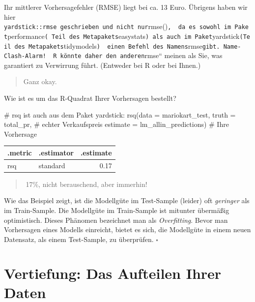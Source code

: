 \documentclass[
  letterpaper,
  twoside,
  open=any]{scrbook}
\newenvironment{Shaded}{\begin{snugshade}}{\end{snugshade}}
\newcommand{\AttributeTok}[1]{\textcolor[rgb]{0.40,0.45,0.13}{#1}}
\newcommand{\CommentTok}[1]{\textcolor[rgb]{0.37,0.37,0.37}{#1}}
\newcommand{\FunctionTok}[1]{\textcolor[rgb]{0.28,0.35,0.67}{#1}}
\newcommand{\NormalTok}[1]{\textcolor[rgb]{0.00,0.23,0.31}{#1}}
\theoremstyle{definition}
\theoremstyle{definition}
\theoremstyle{definition}
\theoremstyle{remark}
\begin{document}
Ihr mittlerer Vorhersagefehler (RMSE) liegt bei ca. 13 Euro. Übrigens
haben wir hier
\texttt{yardstick::rmse\ geschrieben\ und\ nicht\ nur}rmse()\texttt{,\ \ da\ es\ sowohl\ im\ Paket}performance\texttt{(\ Teil\ des\ Metapakets}easystats\texttt{)\ als\ auch\ im\ Paket}yardstick\texttt{(Teil\ des\ Metapakets}tidymodels\texttt{)\ \ einen\ Befehl\ des\ Namens}rmse\texttt{gibt.\ Name-Clash-Alarm!\ \ R\ könnte\ daher\ den\ anderen}rmse``
meinen als Sie, was garantiert zu Verwirrung führt. (Entweder bei R oder
bei Ihnen.)

\begin{quote}
{} Ganz okay.
\end{quote}

Wie ist es um das R-Quadrat Ihrer Vorhersagen bestellt?

\begin{Shaded}
\begin{Highlighting}[]
\CommentTok{\# \textasciigrave{}rsq \textasciigrave{} ist auch aus dem Paket yardstick:}
\FunctionTok{rsq}\NormalTok{(}\AttributeTok{data =}\NormalTok{ mariokart\_test,}
    \AttributeTok{truth =}\NormalTok{ total\_pr,  }\CommentTok{\# echter Verkaufspreis}
    \AttributeTok{estimate =}\NormalTok{ lm\_allin\_predictions)  }\CommentTok{\# Ihre Vorhersage}
\end{Highlighting}
\end{Shaded}

\begin{longtable}[]{@{}llr@{}}
\toprule\noalign{}
.metric & .estimator & .estimate \\
\midrule\noalign{}
\endhead
\bottomrule\noalign{}
\endlastfoot
rsq & standard & 0.17 \\
\end{longtable}

\begin{quote}
{}️ 17\%, nicht berauschend, aber immerhin!
\end{quote}

Wie das Beispiel zeigt, ist die Modellgüte im Test-Sample (leider) oft
\emph{geringer} als im Train-Sample. Die Modellgüte im Train-Sample ist
mitunter übermäßig optimistisch. Dieses Phänomen bezeichnet man als
\emph{Overfitting}. Bevor man Vorhersagen eines Modells einreicht,
bietet es sich, die Modellgüte in einem neuen Datensatz, als einem
Test-Sample, zu überprüfen. \(\square\)

\section{Vertiefung: Das Aufteilen Ihrer
Daten}\label{vertiefung-das-aufteilen-ihrer-daten}
\end{document}
